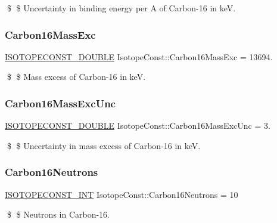 \$ \$ Uncertainty in binding energy per A of Carbon-\/16 in keV. \mbox{\label{group___isotope_const-_carbon-_c16_ga34bdc0162715b4204eb5388a7350e3d4}} 
\subsubsection{\texorpdfstring{Carbon16\+Mass\+Exc}{Carbon16MassExc}}
{\footnotesize\ttfamily \mbox{\hyperlink{group___isotope_const-_macros_ga8f45a7272ce02c0b4c65c44636ed719a}{I\+S\+O\+T\+O\+P\+E\+C\+O\+N\+S\+T\+\_\+\+D\+O\+U\+B\+LE}} Isotope\+Const\+::\+Carbon16\+Mass\+Exc = 13694.}

\$ \$ Mass excess of Carbon-\/16 in keV. \mbox{\label{group___isotope_const-_carbon-_c16_ga5ba41785e7573226be0d2f5a85f150f6}} 
\subsubsection{\texorpdfstring{Carbon16\+Mass\+Exc\+Unc}{Carbon16MassExcUnc}}
{\footnotesize\ttfamily \mbox{\hyperlink{group___isotope_const-_macros_ga8f45a7272ce02c0b4c65c44636ed719a}{I\+S\+O\+T\+O\+P\+E\+C\+O\+N\+S\+T\+\_\+\+D\+O\+U\+B\+LE}} Isotope\+Const\+::\+Carbon16\+Mass\+Exc\+Unc = 3.}

\$ \$ Uncertainty in mass excess of Carbon-\/16 in keV. \mbox{\label{group___isotope_const-_carbon-_c16_gab70a361bd5370223b030ea5d910d752e}} 
\subsubsection{\texorpdfstring{Carbon16\+Neutrons}{Carbon16Neutrons}}
{\footnotesize\ttfamily \mbox{\hyperlink{group___isotope_const-_macros_ga5f18360b3e99483a35c32d789e62621c}{I\+S\+O\+T\+O\+P\+E\+C\+O\+N\+S\+T\+\_\+\+I\+NT}} Isotope\+Const\+::\+Carbon16\+Neutrons = 10}

\$ \$ Neutrons in Carbon-\/16. \mbox{\label{group___isotope_const-_carbon-_c16_ga1611f731be98d5c434c61a41bc61e7d7}} 
